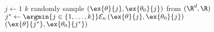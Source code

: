 \documentclass[10pt,oneside]{book}
\begin{document}
\pagestyle{empty}
\thispagestyle{empty}

\begin{codebox}
  \li \For $j \gets 1$ \To $k$
  \li   \Do
          randomly sample $\left(\ex{\theta}{j},
            \ex{\theta_0}{j}\right)$ from $(\R^d, \R)$
        \End
  \li $j^* \gets \argmin{j \in \{1, \ldots, k\}} \mathcal{E}_n \left(\ex{\theta}{j}, \ex{\theta_0}{j}\right)$
  \li \Return $\left(\ex{\theta}{j^*}, \ex{\theta_0}{j^*}\right)$
\end{codebox}
\end{document}
